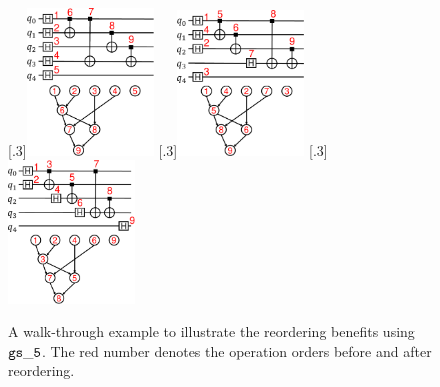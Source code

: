 \begin{figure}[h!]
    \centering
    \subcaptionbox{\label{fig:orgorder}}[.3\textwidth]{\includegraphics[width=0.3\textwidth]{Images/appendix2/section-4/orgorder.pdf}}
    \hspace{0pt}
    \subcaptionbox{\label{fig:greedyorder}}[.3\textwidth]{\includegraphics[width=0.3\textwidth]{Images/appendix2/section-4/greedyorder.pdf}}
    \subcaptionbox{\label{fig:forwardorder}}[.3\textwidth]{\includegraphics[width=0.3\textwidth]{Images/appendix2/section-4/forwardorder.pdf}}
    \vspace{00pt}
    \caption{A walk-through example to illustrate the reordering benefits using ${\tt gs\_5}$. The red number denotes the operation orders before and after reordering.}
    \vspace{0pt}
\label{fig:reorder}
\vspace{-5pt}
\end{figure}

